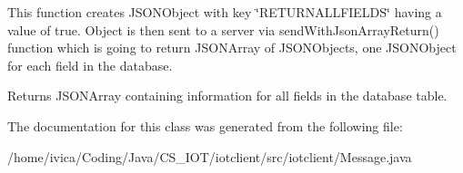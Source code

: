 This function creates J\+S\+O\+N\+Object with key \char`\"{}\+R\+E\+T\+U\+R\+N\+A\+L\+L\+F\+I\+E\+L\+D\+S\char`\"{} having a value of true. Object is then sent to a server via send\+With\+Json\+Array\+Return() function which is going to return J\+S\+O\+N\+Array of J\+S\+O\+N\+Objects, one J\+S\+O\+N\+Object for each field in the database.

\begin{DoxyReturn}{Returns}
J\+S\+O\+N\+Array containing information for all fields in the database table. 
\end{DoxyReturn}


The documentation for this class was generated from the following file\+:\begin{DoxyCompactItemize}
\item 
/home/ivica/\+Coding/\+Java/\+C\+S\+\_\+\+I\+O\+T/iotclient/src/iotclient/Message.\+java\end{DoxyCompactItemize}
